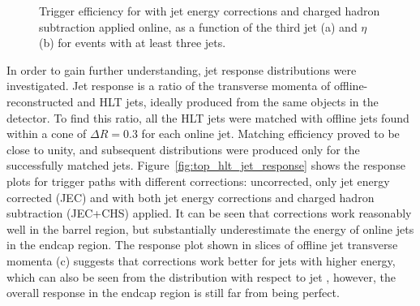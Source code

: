 \begin{figure}[hbtp]
  \centering
  \hfill
  \caption[\HLTThreeCentralPFJet trigger efficiency as a function of the third jet \pt and $\eta$]{Trigger efficiency for
  \HLTThreeCentralPFJet with jet energy corrections and charged hadron subtraction applied online, as a function of the
  third jet \pt (a) and $\eta$ (b) for events with at least three jets.}
\label{fig:top_hlt_pt_eta_JEC_PFnoPU_3jets} 
\end{figure}

In order to gain further understanding, jet response distributions were investigated. Jet response is a ratio of the
transverse momenta of offline-reconstructed and HLT jets, ideally produced from the same objects in the detector. To
find this ratio, all the HLT jets were matched with offline jets found within a cone of $\Delta R = 0.3$ for each online
jet. Matching efficiency proved to be close to unity, and subsequent distributions were produced only for the
successfully matched jets. Figure~\ref{fig:top_hlt_jet_response} shows the response plots for trigger paths with
different corrections: uncorrected, only jet energy corrected (JEC) and with both jet energy corrections and charged
hadron subtraction (JEC+CHS) applied. It can be seen that corrections work reasonably well in the barrel region, but
substantially underestimate the energy of online jets in the endcap region. The response plot shown in slices of offline
jet transverse momenta (c) suggests that corrections work better for jets with higher energy, which can also be seen
from the distribution with respect to jet \pt, however, the overall response in the endcap region is still far from
being perfect.

